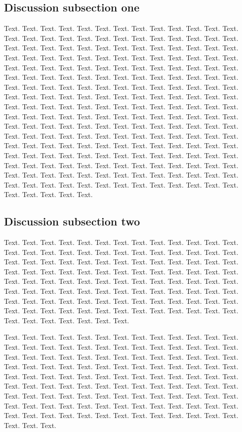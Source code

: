 \documentclass[a4,center,fleqn]{NAR}
\begin{document}
\subsection{Discussion subsection one}

Text. Text. Text. Text. Text. Text. Text. Text. Text. Text. Text.
Text. Text. Text. Text. Text. Text. Text. Text. Text. Text. Text.
Text. Text. Text. Text. Text. Text. Text. Text. Text. Text. Text.
Text. Text. Text. Text. Text. Text. Text. Text. Text. Text. Text.
Text. Text. Text. Text. Text. Text. Text. Text. Text. Text. Text.
Text. Text. Text. Text. Text. Text. Text. Text. Text. Text. Text.
Text. Text. Text. Text. Text. Text. Text. Text. Text. Text. Text.
Text. Text. Text. Text. Text. Text. Text. Text. Text. Text. Text.
Text. Text. Text. Text. Text. Text. Text. Text. Text. Text. Text.
Text. Text. Text. Text. Text. Text. Text. Text. Text. Text. Text.
Text. Text. Text. Text. Text. Text. Text. Text. Text. Text. Text.
Text. Text. Text. Text. Text. Text. Text. Text. Text. Text. Text.
Text. Text. Text. Text. Text. Text. Text. Text. Text. Text. Text.
Text. Text. Text. Text. Text. Text. Text. Text. Text. Text. Text.
Text. Text. Text. Text. Text. Text. Text. Text. Text. Text. Text.
Text. Text. Text. Text. Text. Text. Text. Text. Text. Text. Text.
Text. Text. Text. Text. Text. Text. Text. Text. Text. Text. Text.
Text. Text. Text. Text. Text. Text. Text. Text. Text. Text. Text.
Text. Text. Text. Text. Text. Text. Text. Text. Text. Text. Text.
Text. Text. Text. Text. Text. Text. Text. Text. Text. Text. Text.
Text. Text. Text. Text. Text. Text.


\subsection{Discussion subsection two}

Text. Text. Text. Text. Text. Text. Text. Text. Text. Text. Text.
Text. Text. Text. Text. Text. Text. Text. Text. Text. Text. Text.
Text. Text. Text. Text. Text. Text. Text. Text. Text. Text. Text.
Text. Text. Text. Text. Text. Text. Text. Text. Text. Text. Text.
Text. Text. Text. Text. Text. Text. Text. Text. Text. Text. Text.
Text. Text. Text. Text. Text. Text. Text. Text. Text. Text. Text.
Text. Text. Text. Text. Text. Text. Text. Text. Text. Text. Text.
Text. Text. Text. Text. Text. Text. Text. Text. Text. Text. Text.
Text. Text. Text. Text. Text. Text. Text. Text. Text. Text. Text.
Text. Text. Text. Text. Text. Text. Text. Text. Text. Text. Text.
Text.

Text. Text. Text. Text. Text. Text. Text. Text. Text. Text. Text.
Text. Text. Text. Text. Text. Text. Text. Text. Text. Text. Text.
Text. Text. Text. Text. Text. Text. Text. Text. Text. Text. Text.
Text. Text. Text. Text. Text. Text. Text. Text. Text. Text. Text.
Text. Text. Text. Text. Text. Text. Text. Text. Text. Text. Text.
Text. Text. Text. Text. Text. Text. Text. Text. Text. Text. Text.
Text. Text. Text. Text. Text. Text. Text. Text. Text. Text. Text.
Text. Text. Text. Text. Text. Text. Text. Text. Text. Text. Text.
Text. Text. Text. Text. Text. Text. Text. Text. Text. Text. Text.
Text. Text. Text. Text. Text. Text. Text. Text. Text. Text. Text.
Text. Text. Text. Text. Text. Text. Text. Text. Text. Text.
\end{document}
